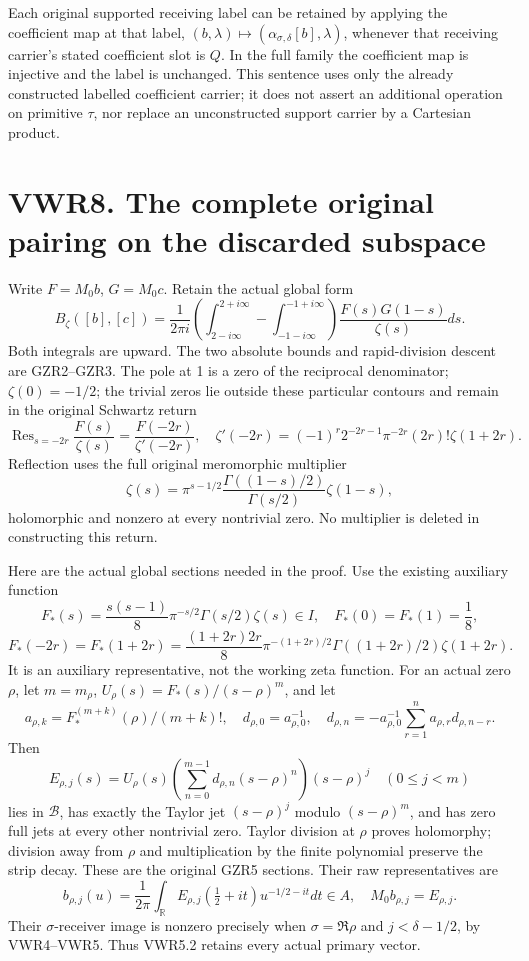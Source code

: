 Each original supported receiving label can be retained by applying the
coefficient map at that label,
\((b,\lambda)\mapsto(\alpha_{\sigma,\delta}[b],\lambda)\), whenever that
receiving carrier's stated coefficient slot is \(Q\). In the full family
the coefficient map is injective and the label is unchanged. This
sentence uses only the already constructed labelled coefficient carrier;
it does not assert an additional operation on primitive \(\tau\), nor
replace an unconstructed support carrier by a Cartesian product.

\section{VWR8. The complete original pairing on the discarded
subspace}\label{vwr8.-the-complete-original-pairing-on-the-discarded-subspace}

Write \(F=M_0b\), \(G=M_0c\). Retain the actual global form \[
B_\zeta([b],[c])=\frac1{2\pi i}
\left(\int_{2-i\infty}^{2+i\infty}-\int_{-1-i\infty}^{-1+i\infty}\right)
\frac{F(s)G(1-s)}{\zeta(s)}ds.
\tag{VWR8.1}
\] Both integrals are upward. The two absolute bounds and rapid-division
descent are GZR2--GZR3. The pole at 1 is a zero of the reciprocal
denominator; \(\zeta(0)=-1/2\); the trivial zeros lie outside these
particular contours and remain in the original Schwartz return \[
\operatorname{Res}_{s=-2r}\frac{F(s)}{\zeta(s)}
=\frac{F(-2r)}{\zeta'(-2r)},\quad
\zeta'(-2r)=(-1)^r2^{-2r-1}\pi^{-2r}(2r)!\zeta(1+2r).
\tag{VWR8.2}
\] Reflection uses the full original meromorphic multiplier \[
\zeta(s)=\pi^{s-1/2}\frac{\Gamma((1-s)/2)}{\Gamma(s/2)}\zeta(1-s),
\tag{VWR8.3}
\] holomorphic and nonzero at every nontrivial zero. No multiplier is
deleted in constructing this return.

Here are the actual global sections needed in the proof. Use the
existing auxiliary function \[
F_*(s)=\frac{s(s-1)}8\pi^{-s/2}\Gamma(s/2)\zeta(s)\in I,
\quad F_*(0)=F_*(1)=\frac18,
\] \[
F_*(-2r)=F_*(1+2r)
=\frac{(1+2r)2r}{8}\pi^{-(1+2r)/2}\Gamma((1+2r)/2)\zeta(1+2r).
\tag{VWR8.4}
\] It is an auxiliary representative, not the working zeta function. For
an actual zero \(\rho\), let \(m=m_\rho\),
\(U_\rho(s)=F_*(s)/(s-\rho)^m\), and let \[
a_{\rho,k}=F_*^{(m+k)}(\rho)/(m+k)!,\quad d_{\rho,0}=a_{\rho,0}^{-1},\quad
d_{\rho,n}=-a_{\rho,0}^{-1}\sum_{r=1}^na_{\rho,r}d_{\rho,n-r}.
\] Then \[
E_{\rho,j}(s)=U_\rho(s)\left(\sum_{n=0}^{m-1}d_{\rho,n}(s-\rho)^n\right)(s-\rho)^j
\quad(0\le j<m)
\tag{VWR8.5}
\] lies in \(\mathcal B\), has exactly the Taylor jet \((s-\rho)^j\)
modulo \((s-\rho)^m\), and has zero full jets at every other nontrivial
zero. Taylor division at \(\rho\) proves holomorphy; division away from
\(\rho\) and multiplication by the finite polynomial preserve the strip
decay. These are the original GZR5 sections. Their raw representatives
are \[
b_{\rho,j}(u)=\frac1{2\pi}\int_{\mathbb R}
 E_{\rho,j}(\tfrac12+it)u^{-1/2-it}dt\in A,
\quad M_0b_{\rho,j}=E_{\rho,j}.
\tag{VWR8.6}
\] Their \(\sigma\)-receiver image is nonzero precisely when
\(\sigma=\Re\rho\) and \(j<\delta-1/2\), by VWR4--VWR5. Thus VWR5.2
retains every actual primary vector.

